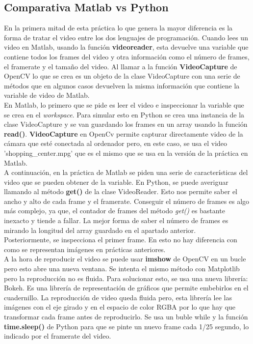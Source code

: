 \documentclass[a4paper,12pt]{report}
\begin{document}
\subsection{Comparativa Matlab vs Python}

En la primera mitad de esta práctica lo que genera la mayor diferencia es la forma de tratar el video entre los dos lenguajes de programación. Cuando lees un video en Matlab, usando la función \textbf{videoreader}, esta devuelve una variable que contiene todos los frames del video y otra información como el número de frames, el framerate y el tamaño del video. Al llamar a la función \textbf{VideoCapture} de OpenCV lo que se crea es un objeto de la clase VideoCapture con una serie de métodos que en algunos casos devuelven la misma información que contiene la variable de video de Matlab.\\

En Matlab, lo primero que se pide es leer el video e inspeccionar la variable que se crea en el \emph{workspace}. Para simular esto en Python se crea una instancia de la clase VideoCapture y se van guardando los frames en un array usando la función \textbf{read()}. \textbf{VideoCapture} en OpenCv permite capturar directamente video de la cámara que esté conectada al ordenador pero, en este caso, se usa el video 'shopping\_center.mpg' que es el mismo que se usa en la versión de la práctica en Matlab.\\

A continuación, en la práctica de Matlab se piden una serie de características del video que se pueden obtener de la variable. En Python, se puede averiguar llamando al método \textbf{get()} de la clase VideoReader. Esto nos permite saber el ancho y alto de cada frame y el framerate. Conseguir el número de frames es algo más complejo, ya que, el contador de frames del método \emph{get()} es bastante inexacto y tiende a fallar. La mejor forma de saber el número de frames es mirando la longitud del array guardado en el apartado anterior.\\

Posteriormente, se inspecciona el primer frame. En esto no hay diferencia con como se representan imágenes en prácticas anteriores.\\

A la hora de reproducir el video se puede usar \textbf{imshow} de OpenCV en un bucle pero esto abre una nueva ventana. Se intenta el mismo método con Matplotlib pero la reproducción no es fluida. Para solucionar esto, se usa una nueva librería: Bokeh. Es una librería de representación de gráficos que permite embebirlos en el cuadernillo. La reproducción de video queda fluida pero, esta librería lee las imágenes con el eje girado y en el espacio de color RGBA por lo que hay que transformar cada frame antes de reproducirlo. Se usa un buble while y la función \textbf{time.sleep()} de Python para que se pinte un nuevo frame cada 1/25 segundo, lo indicado por el framerate del video.\\
\end{document}
